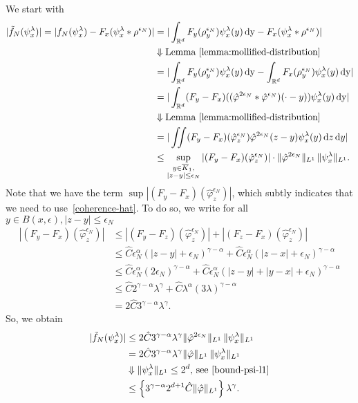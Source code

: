 We start with
\begin{align*}
    |\tilde f_N (\psi^\lambda_x) |
    = |f_N(\psi^\lambda_x) - F_x(\psi^\lambda_x * \rho^{\epsilon_N}) |
    &= |\int_{\mathbb{R}^d} F_y(\rho_y^{\epsilon_N}) \psi^{\lambda}_x(y) \, \mathrm{dy} - F_x(\psi^\lambda_x * \rho^{\epsilon_N})| \\
    &\Downarrow \text{Lemma~\ref{lemma:mollified-distribution}} \\
    &= |\int_{\mathbb{R}^d} F_y(\rho_y^{\epsilon_N}) \psi^{\lambda}_x(y) \, \mathrm{dy} - \int_{\mathbb{R}^d} F_x(\rho_y^{\epsilon_N}) \psi^{\lambda}_x(y) \, \mathrm{dy}| \\
    &= |\int_{\mathbb{R}^d} (F_y - F_x)((\hat \varphi^{2\epsilon_N} * \hat \varphi^{\epsilon_N})(\cdot - y)) \psi^{\lambda}_x(y) \, \mathrm{dy}|\\
    &\Downarrow \text{Lemma~\ref{lemma:mollified-distribution}} \\
    &= |\iint (F_y - F_x)(\hat \varphi^{\epsilon_N}_z) \hat \varphi^{2 \epsilon_N}(z-y)\psi^\lambda_x(y) \, \mathrm{d}z \, \mathrm{d}y| \\
    &\leq\sup_{\substack{y \in \overline K_1,\\|z-y|\leq\epsilon_N}} |(F_y - F_x)(\hat \varphi^{\epsilon_N}_z)| \cdot \lVert \hat \varphi^{2\epsilon_N}\rVert_{L^1} \, \lVert \psi^{\lambda}_x\rVert_{L^1}.
\end{align*}
Note that we have the term \(\sup|(F_y - F_x)(\hat \varphi^{\epsilon_N}_z)|\), which subtly indicates that we need to use~\eqref{coherence-hat}. To do so, we write for all \(y \in  B(x,\epsilon),|z-y|\leq\epsilon_N\)
\begin{align*}
    |(F_y - F_x)(\hat \varphi^{\epsilon_N}_z)| &\leq |(F_y - F_z)(\hat \varphi^{\epsilon_N}_z)| + |(F_z - F_x)(\hat \varphi^{\epsilon_N}_z)| \\
    &\leq \hat C \epsilon_N^\alpha(|z-y| + \epsilon_N)^{\gamma - \alpha} + \hat C \epsilon_N^\alpha(|z-x| + \epsilon_N)^{\gamma - \alpha} \\
    &\leq \hat C \epsilon_N^\alpha (2\epsilon_N)^{\gamma - \alpha} + \hat C \epsilon_N^\alpha (|z-y| + |y-x| + \epsilon_N)^{\gamma - \alpha} \\
    &\leq \hat C  2^{\gamma - \alpha} \lambda^{\gamma} +  \hat C  \lambda^\alpha(3\lambda)^{\gamma - \alpha} \\
    &= 2 \hat C 3^{\gamma - \alpha}\lambda^\gamma.
\end{align*}
So, we obtain
\begin{align*}
    |\tilde f_N (\psi^\lambda_x) | 
    &\leq 2 \hat C 3^{\gamma - \alpha}\lambda^\gamma \lVert \hat \varphi^{2\epsilon_N}\rVert_{L^1} \, \lVert \psi^{\lambda}_x\rVert_{L^1}\\
     &= 2 \hat C 3^{\gamma - \alpha}\lambda^\gamma \lVert \hat \varphi\rVert_{L^1} \, \lVert \psi^{\lambda}_x\rVert_{L^1} \\
     &\Downarrow \text{\(\lVert \psi^{\lambda}_x\rVert_{L^1} \leq 2^d\), see~\eqref{bound-psi-l1}} \\
     &\leq \left \{ 3^{\gamma - \alpha} 2^{d+1} \hat C  \lVert \hat \varphi\rVert_{L^1} \right \} \lambda^\gamma.
\end{align*}

